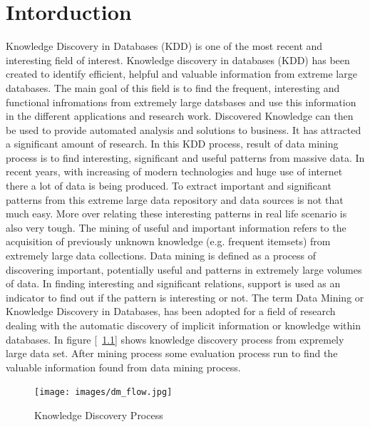 %
\chapter{Intorduction}
Knowledge Discovery in Databases (KDD) is one of the most recent and interesting field of interest. Knowledge discovery in databases (KDD) has been created to identify efficient, helpful and valuable information from extreme large databases. The main goal of this field is to find the frequent, interesting and functional infromations from extremely large datsbases and use this information in the different applications and research work. Discovered Knowledge can then be used to provide automated analysis and solutions to business. It has attracted a significant amount of research. In this KDD process, result of data mining process is to find interesting, significant and useful patterns from massive data. In recent years, with increasing of modern technologies and huge use of internet there a lot of data is being produced. To extract important and significant patterns from this extreme large data repository and data sources is not that much easy. More over relating these interesting patterns in real life scenario is also very tough. The mining of useful and important information refers to the acquisition of previously unknown knowledge (e.g. frequent itemsets) from extremely large data collections. Data mining is defined as a process of discovering important, potentially useful and patterns in extremely large volumes of data. In finding interesting and significant relations, support is used as an indicator to find out if the pattern is interesting or not. The term Data Mining or Knowledge Discovery in Databases, has been adopted for a field of research dealing with the automatic discovery of implicit information or knowledge within databases. In figure [~\ref{figure:dm_flow}] shows knowledge discovery process from expremely large data set. After mining process some evaluation process run to find the valuable information found from data mining process.\\
\begin{figure}
\centering
  \texttt{[image: images/dm\_flow.jpg]}
\caption{Knowledge Discovery Process}
\label{figure:dm_flow}
\end{figure}
